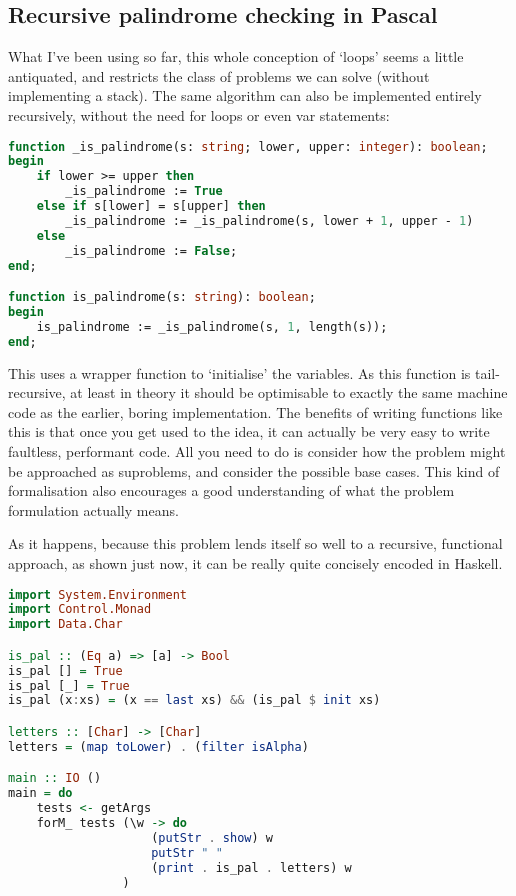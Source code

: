 \documentclass[fleqn,a4paper,11pt]{article}
\begin{document}
    \subsection{Recursive palindrome checking in Pascal}

    What I've been using so far, this whole conception of `loops' seems a little
    antiquated, and restricts the class of problems we can solve (without
    implementing a stack). The same algorithm can also be implemented entirely
    recursively, without the need for loops or even var statements:

\begin{lstlisting}[language=Pascal, caption=Recursive palindrome function in Pascal]
function _is_palindrome(s: string; lower, upper: integer): boolean;
begin
    if lower >= upper then
        _is_palindrome := True
    else if s[lower] = s[upper] then
        _is_palindrome := _is_palindrome(s, lower + 1, upper - 1)
    else
        _is_palindrome := False;
end;

function is_palindrome(s: string): boolean;
begin
    is_palindrome := _is_palindrome(s, 1, length(s));
end;
\end{lstlisting}

    This uses a wrapper function to `initialise' the variables. As this function
    is tail-recursive, at least in theory it should be optimisable to exactly
    the same machine code as the earlier, boring implementation. The benefits of
    writing functions like this is that once you get used to the idea, it can
    actually be very easy to write faultless, performant code. All you need to
    do is consider how the problem might be approached as suproblems, and
    consider the possible base cases. This kind of formalisation also encourages
    a good understanding of what the problem formulation actually means.

    As it happens, because this problem lends itself so well to a recursive,
    functional approach, as shown just now, it can be really quite concisely
    encoded in Haskell.

\begin{lstlisting}[language=Haskell, caption=Palindrome function in Haskell]
import System.Environment
import Control.Monad
import Data.Char

is_pal :: (Eq a) => [a] -> Bool
is_pal [] = True
is_pal [_] = True
is_pal (x:xs) = (x == last xs) && (is_pal $ init xs)

letters :: [Char] -> [Char]
letters = (map toLower) . (filter isAlpha)

main :: IO ()
main = do
    tests <- getArgs
    forM_ tests (\w -> do
                    (putStr . show) w
                    putStr " "
                    (print . is_pal . letters) w
                )
\end{lstlisting}
\end{document}
